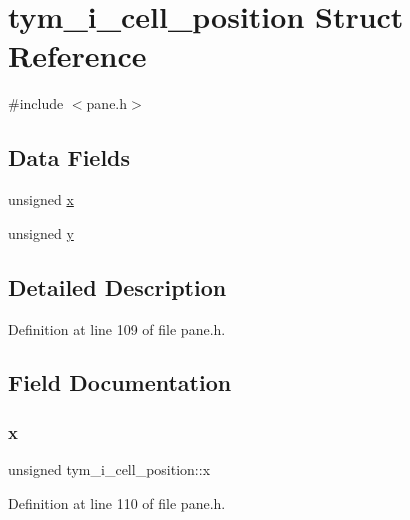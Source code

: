 \hypertarget{structtym__i__cell__position}{}\section{tym\+\_\+i\+\_\+cell\+\_\+position Struct Reference}
\label{structtym__i__cell__position}


{\ttfamily \#include $<$pane.\+h$>$}

\subsection*{Data Fields}
\begin{DoxyCompactItemize}
\item 
unsigned \hyperlink{structtym__i__cell__position_a6481c197b637d226dfbf3bcaf771bab5}{x}
\item 
unsigned \hyperlink{structtym__i__cell__position_a82542ee37778b609c1e1ab7043938358}{y}
\end{DoxyCompactItemize}


\subsection{Detailed Description}


Definition at line 109 of file pane.\+h.



\subsection{Field Documentation}
\mbox{\label{structtym__i__cell__position_a6481c197b637d226dfbf3bcaf771bab5}} 
\subsubsection{\texorpdfstring{x}{x}}
{\footnotesize\ttfamily unsigned tym\+\_\+i\+\_\+cell\+\_\+position\+::x}



Definition at line 110 of file pane.\+h.

\mbox{\label{structtym__i__cell__position_a82542ee37778b609c1e1ab7043938358}} 
